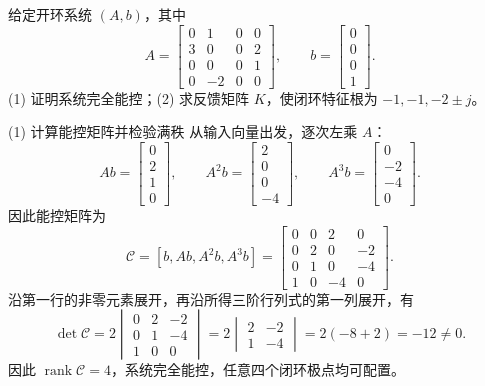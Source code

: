 \documentclass[11pt]{article}
\begin{document}
\begin{problem}[原题 6]
给定开环系统 $(A,b)$，其中
\[
A=\begin{bmatrix}0&1&0&0\\3&0&0&2\\0&0&0&1\\0&-2&0&0\end{bmatrix},\qquad
b=\begin{bmatrix}0\\0\\0\\1\end{bmatrix}.
\]
(1) 证明系统完全能控；(2) 求反馈矩阵 $K$，使闭环特征根为 $-1,-1,-2\pm j$。
\end{problem}
\begin{solution}
\begin{proofstep}{(1) 计算能控矩阵并检验满秩}
从输入向量出发，逐次左乘 $A$：
\[
Ab=\begin{bmatrix}0\\2\\1\\0\end{bmatrix},\qquad
A^2b=\begin{bmatrix}2\\0\\0\\-4\end{bmatrix},\qquad
A^3b=\begin{bmatrix}0\\-2\\-4\\0\end{bmatrix}.
\]
因此能控矩阵为
\[
\mathcal C=[b,Ab,A^2b,A^3b]
=\begin{bmatrix}
0&0&2&0\\0&2&0&-2\\0&1&0&-4\\1&0&-4&0
\end{bmatrix}.
\]
沿第一行的非零元素展开，再沿所得三阶行列式的第一列展开，有
\[
\det\mathcal C
=2\begin{vmatrix}0&2&-2\\0&1&-4\\1&0&0\end{vmatrix}
=2\begin{vmatrix}2&-2\\1&-4\end{vmatrix}
=2(-8+2)=-12\ne0.
\]
因此 $\operatorname{rank}\mathcal C=4$，系统完全能控，任意四个闭环极点均可配置。
\end{proofstep}


\end{solution}
\end{document}
